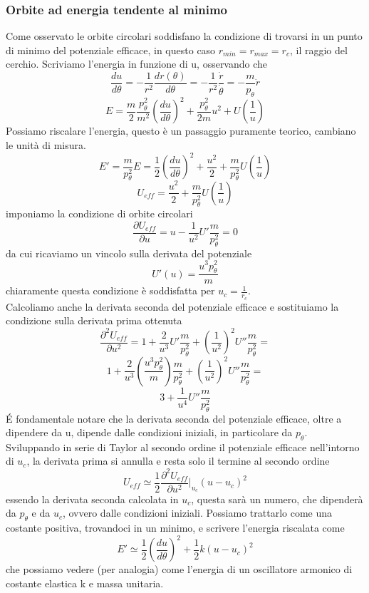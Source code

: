 \documentclass[
10pt, %
a4paper, %
oneside, %
headinclude,footinclude, %
BCOR5mm, %
]{scrartcl}
\begin{document}
\subsubsection{Orbite ad energia tendente al minimo}
Come osservato le orbite circolari soddisfano la condizione di trovarsi in un punto di minimo del potenziale efficace, in questo caso \(r_{min} = r_{max} = r_c\), il raggio del cerchio. Scriviamo l'energia in funzione di u, osservando che
\[\frac{du}{d\theta} = -\frac{1}{r^2}\frac{dr(\theta)}{d\theta} = -\frac{1}{r^2}\frac{\dot{r}}{\dot{\theta}} = -\frac{m}{p_\theta}\dot{r}\]
\[E = \frac{m}{2}\frac{p_\theta^2}{m^2}\left(\frac{du}{d\theta}\right)^2+\frac{p_\theta^2}{2m}u^2+U(\frac{1}{u})\]
Possiamo riscalare l'energia, questo è un passaggio puramente teorico, cambiano le unità di misura.
\[E' = \frac{m}{p_\theta^2}E = \frac{1}{2}\left(\frac{du}{d\theta}\right)^2+\frac{u^2}{2}+\frac{m}{p_\theta^2}U(\frac{1}{u})\]
\[U_{eff} = \frac{u^2}{2}+\frac{m}{p_\theta^2}U(\frac{1}{u})\]
imponiamo la condizione di orbite circolari
\[\frac{\partial U_{eff}}{\partial u} = u-\frac{1}{u^2}U'\frac{m}{p_\theta^2} = 0\]
da cui ricaviamo un vincolo sulla derivata del potenziale
\[U'(u) = \frac{u^3p_\theta^2}{m}\]
chiaramente questa condizione è soddisfatta per $u_c = \frac{1}{r_c}$.\\
Calcoliamo anche la derivata seconda del potenziale efficace e sostituiamo la condizione sulla derivata prima ottenuta 
\[\frac{\partial^2 U_{eff}}{\partial u^2} = 1 + \frac{2}{u^3}U'\frac{m}{p_\theta^2}+\left(\frac{1}{u^2}\right)^2U''\frac{m}{p_\theta^2}=\]
\[ 1 + \frac{2}{u^3}\left(\frac{u^3p_\theta^2}{m}\right)\frac{m}{p_\theta^2}+\left(\frac{1}{u^2}\right)^2 U''\frac{m}{p_\theta^2} =\]
\[3+\frac{1}{u^4}U''\frac{m}{p_\theta^2}\]
\'E fondamentale notare che la derivata seconda del potenziale efficace, oltre a dipendere da u, dipende dalle condizioni iniziali, in particolare da \(p_\theta\).\\
Sviluppando in serie di Taylor al secondo ordine il potenziale efficace nell'intorno di \(u_c\), la derivata prima si annulla e resta solo il termine al secondo ordine 
\[U_{eff} \simeq \frac{1}{2}\frac{\partial^2 U_{eff}}{\partial u^2}|_{u_c}(u-u_c)^2 \]
essendo la derivata seconda calcolata in \(u_c\), questa sarà un numero, che dipenderà da \(p_\theta\) e da \(u_c\), ovvero dalle condizioni iniziali. Possiamo trattarlo come una costante positiva, trovandoci in un minimo, e scrivere l'energia riscalata come
\[E' \simeq \frac{1}{2}\left(\frac{du}{d\theta}\right)^2+\frac{1}{2}k(u-u_c)^2\]
che possiamo vedere (per analogia) come l'energia di un oscillatore armonico di costante elastica k e massa unitaria.
\end{document}
